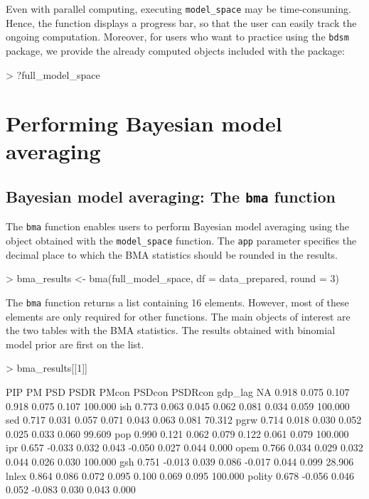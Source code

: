 \documentclass[a4paper]{article}
\begin{document}
Even with parallel computing, executing \verb+model_space+ may be time-consuming.
Hence, the function displays a progress bar,
so that the user can easily track the ongoing computation.
Moreover, for users who want to practice using the \verb+bdsm+ package,
we provide the already computed objects included with the package:

\begin{Schunk}
\begin{Sinput}
> ?full_model_space
\end{Sinput}
\end{Schunk}

\section{Performing Bayesian model averaging}\label{using_bma}

\subsection{Bayesian model averaging: The \texttt{bma} function}

The \verb+bma+ function enables users to perform Bayesian model averaging using
the object obtained with the \verb+model_space+ function.
The \verb+app+ parameter specifies the decimal place to which the BMA statistics should be rounded in the results.

\begin{Schunk}
\begin{Sinput}
> bma_results <- bma(full_model_space, df = data_prepared, round = 3)
\end{Sinput}
\end{Schunk}

The \verb+bma+ function returns a list containing 16 elements.
However, most of these elements are only required for other functions.
The main objects of interest are the two tables with the BMA statistics.
The results obtained with binomial model prior are first on the list.

\begin{Schunk}
\begin{Sinput}
> bma_results[[1]]
\end{Sinput}
\begin{Soutput}
          PIP     PM   PSD  PSDR  PMcon PSDcon PSDRcon    %
gdp_lag    NA  0.918 0.075 0.107  0.918  0.075   0.107 100.000
ish     0.773  0.063 0.045 0.062  0.081  0.034   0.059 100.000
sed     0.717  0.031 0.057 0.071  0.043  0.063   0.081  70.312
pgrw    0.714  0.018 0.030 0.052  0.025  0.033   0.060  99.609
pop     0.990  0.121 0.062 0.079  0.122  0.061   0.079 100.000
ipr     0.657 -0.033 0.032 0.043 -0.050  0.027   0.044   0.000
opem    0.766  0.034 0.029 0.032  0.044  0.026   0.030 100.000
gsh     0.751 -0.013 0.039 0.086 -0.017  0.044   0.099  28.906
lnlex   0.864  0.086 0.072 0.095  0.100  0.069   0.095 100.000
polity  0.678 -0.056 0.046 0.052 -0.083  0.030   0.043   0.000
\end{Soutput}
\end{Schunk}
\end{document}
